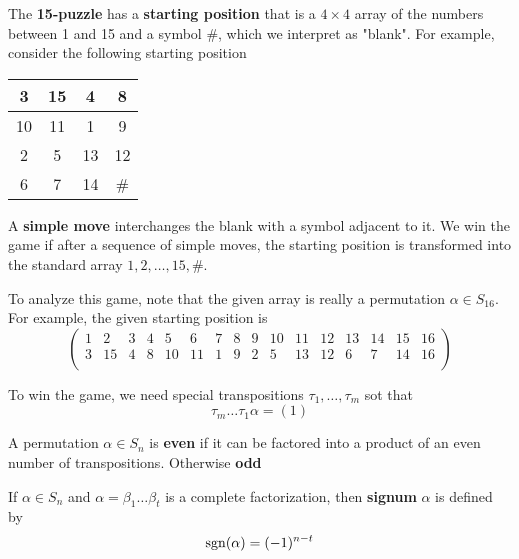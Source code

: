 \documentclass[11pt]{article}
\begin{document}
\begin{examplle}[]
The \textbf{15-puzzle} has a \textbf{starting position} that is a \(4\times 4\) array of the
numbers between 1 and 15 and a symbol \#, which we interpret as "blank". For
example, consider the following starting position

\begin{center}
\begin{tabular}{|c|c|c|c|}
\hline
3 & 15 & 4 & 8\\
\hline
10 & 11 & 1 & 9\\
\hline
2 & 5 & 13 & 12\\
\hline
6 & 7 & 14 & \#\\
\hline
\end{tabular}
\end{center}

A \textbf{simple move} interchanges the blank with a symbol adjacent to it. We win the
game if after a sequence of simple moves, the starting position is
transformed into the standard array \(1,2,\dots,15,\#\). 

To analyze this game, note that the given array is really a permutation
\(\alpha\in S_{16}\). For example, the given starting position is
\[
\begin{pmatrix}
 1 & 2 & 3 & 4 & 5 & 6 & 7 & 8 & 9 & 10 & 11 & 12 & 13 & 14 & 15 & 16 \\
 3 & 15 & 4 & 8 & 10 & 11 & 1 & 9 & 2 & 5 & 13 & 12 & 6 & 7 & 14 & 16 \\
\end{pmatrix}
\]

To win the game, we need special transpositions \(\tau_1,\dots,\tau_m\) sot
that
\begin{equation*}
\tau_m\dots\tau_1\alpha=(1)
\end{equation*}
\end{examplle}

\begin{definition}[]
A permutation \(\alpha\in S_n\) is \textbf{even} if it can be factored into a
product of an even number of transpositions. Otherwise \textbf{odd}
\end{definition}

\begin{definition}[]
If \(\alpha\in S_n\) and \(\alpha=\beta_1\dots\beta_t\) is a complete
factorization, then \textbf{signum} \(\alpha\) is defined by
\begin{equation*}
\operatorname{sgn}(\alpha)=(-1)^{n-t}
\end{equation*}
\end{definition}
\end{document}
